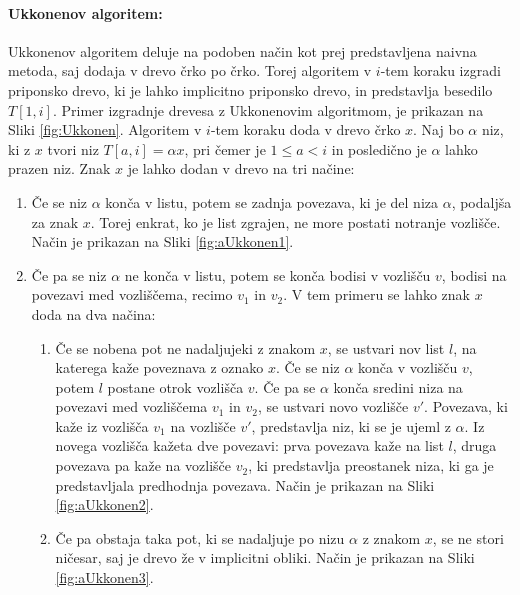 \paragraph{Ukkonenov algoritem:}
Ukkonenov algoritem deluje na podoben način kot prej predstavljena naivna metoda, saj dodaja v drevo črko po črko. Torej algoritem v $i$-tem koraku izgradi priponsko drevo, ki je lahko implicitno priponsko drevo, in predstavlja besedilo $T[1,i]$. Primer  izgradnje drevesa z Ukkonenovim algoritmom, je prikazan na Sliki \ref{fig:Ukkonen}. Algoritem v $i$-tem koraku doda v drevo črko $x$. Naj bo $\alpha$ niz, ki z $x$ tvori niz $T[a,i]=\alpha x$, pri čemer je $1\le a <i $ in posledično je $\alpha$ lahko prazen niz. Znak $x$ je lahko dodan v drevo na tri načine:

\begin{enumerate}
    \item Če se niz $\alpha$ konča v listu, potem se zadnja povezava, ki je del niza $\alpha$, podaljša  za znak $x$. Torej enkrat, ko je list zgrajen, ne more postati notranje vozlišče. Način je prikazan na Sliki \ref{fig:aUkkonen1}.
    \item Če pa se niz $\alpha$ ne konča v listu, potem se konča bodisi v vozlišču $v$, bodisi na povezavi med vozliščema, recimo $v_1$ in $v_2$. V tem primeru se lahko znak $x$ doda na dva načina:
    \begin{enumerate}
        \item \label{enum:dodajanje2} Če se nobena pot ne nadaljujeki z znakom $x$, se ustvari nov list $l$, na katerega kaže poveznava z oznako $x$. Če se niz $\alpha$ konča v vozlišču $v$, potem $l$ postane otrok vozlišča $v$. Če pa se $\alpha$ konča sredini niza na povezavi med vozliščema $v_1$ in $v_2$, se ustvari novo vozlišče $v'$. Povezava, ki kaže iz vozlišča $v_1$ na vozlišče $v'$, predstavlja niz, ki se je ujeml z $\alpha$. Iz novega vozlišča kažeta dve povezavi: prva povezava kaže na list $l$, druga povezava pa kaže na vozlišče $v_2$, ki predstavlja preostanek niza, ki ga je predstavljala predhodnja povezava. Način je prikazan na Sliki \ref{fig:aUkkonen2}.
        \item Če pa obstaja taka pot, ki se nadaljuje po nizu $\alpha$ z znakom $x$, se ne stori ničesar, saj je drevo že v implicitni obliki. Način je prikazan na Sliki \ref{fig:aUkkonen3}.
    \end{enumerate}    
\end{enumerate}

